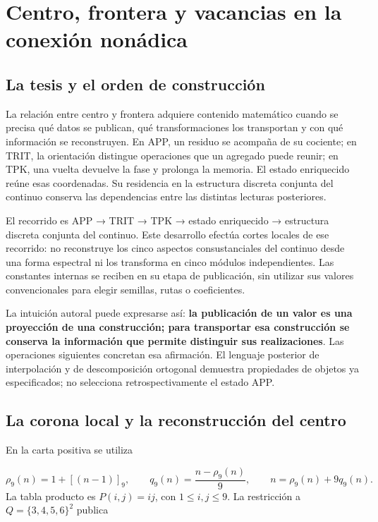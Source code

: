 \section{Centro, frontera y vacancias en la conexión nonádica}
\label{viii:sec:centro-frontera}
\subsection{La tesis y el orden de construcción}
La relación entre centro y frontera adquiere contenido matemático cuando se precisa qué datos se publican, qué transformaciones los transportan y con qué información se reconstruyen. En APP, un residuo se acompaña de su cociente; en TRIT, la orientación distingue operaciones que un agregado puede reunir; en TPK, una vuelta devuelve la fase y prolonga la memoria. El estado enriquecido reúne esas coordenadas. Su residencia en la estructura discreta conjunta del continuo conserva las dependencias entre las distintas lecturas posteriores.

El recorrido es APP → TRIT → TPK → estado enriquecido → estructura discreta conjunta del continuo. Este desarrollo efectúa cortes locales de ese recorrido: no reconstruye los cinco aspectos consustanciales del continuo desde una forma espectral ni los transforma en cinco módulos independientes. Las constantes internas se reciben en su etapa de publicación, sin utilizar sus valores convencionales para elegir semillas, rutas o coeficientes.

La intuición autoral puede expresarse así: \textbf{la publicación de un valor es una proyección de una construcción; para transportar esa construcción se conserva la información que permite distinguir sus realizaciones}. Las operaciones siguientes concretan esa afirmación. El lenguaje posterior de interpolación y de descomposición ortogonal demuestra propiedades de objetos ya especificados; no selecciona retrospectivamente el estado APP.

\subsection{La corona local y la reconstrucción del centro}
En la carta positiva se utiliza

\[
\rho_9(n)=1+[(n-1)]_9,\qquad
q_9(n)=\frac{n-\rho_9(n)}9,
\qquad n=\rho_9(n)+9q_9(n).
\]
La tabla producto es \(P(i,j)=ij\), con \(1\leq i,j\leq9\). La restricción a \(Q=\{3,4,5,6\}^2\) publica

